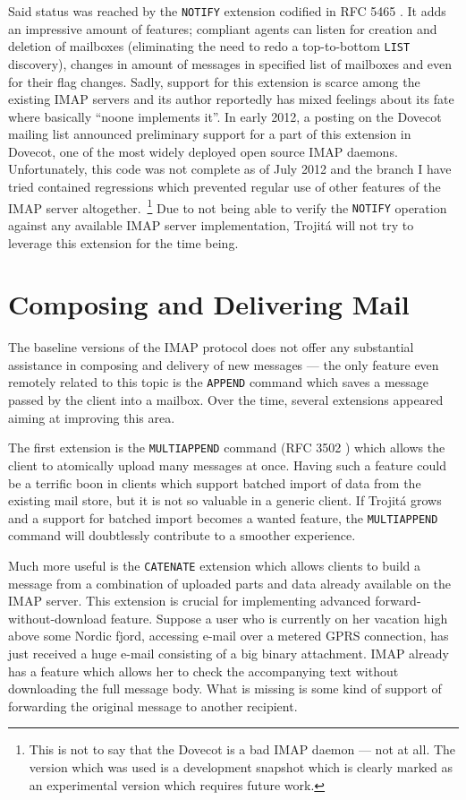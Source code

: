 \documentclass[trojita]{subfiles}
\begin{document}
Said status was reached by the {\tt NOTIFY} extension codified in RFC 5465 \cite{rfc5465}.  It adds an impressive amount
of features; compliant agents can listen for creation and deletion of mailboxes (eliminating the need to redo a
top-to-bottom {\tt LIST} discovery), changes in amount of messages in specified list of mailboxes and even for their
flag changes.  Sadly, support for this extension is scarce among the existing IMAP servers and its author reportedly has
mixed feelings \cite{arnt-good-bad-rfc} about its fate where basically ``noone implements it''.  In early 2012, a
posting on the Dovecot mailing list announced \cite{dovecot-imap-notify} preliminary support for a part of this
extension in Dovecot, one of the most widely deployed open source IMAP daemons.  Unfortunately, this code was not
complete as of July 2012 \cite{dovecot-hg-notify} and the branch I have tried contained regressions which prevented
regular use of other features of the IMAP server altogether.~\footnote{This is not to say that the Dovecot is a bad IMAP
daemon --- not at all.  The version which was used is a development snapshot which is clearly marked as an experimental
version which requires future work.}  Due to not being able to verify the {\tt NOTIFY} operation against any available
IMAP server implementation, Trojitá will not try to leverage this extension for the time being.

\section{Composing and Delivering Mail}

The baseline versions of the IMAP protocol does not offer any substantial assistance in composing and delivery of new
messages --- the only feature even remotely related to this topic is the {\tt APPEND} command which saves a message
passed by the client into a mailbox.  Over the time, several extensions appeared aiming at improving this area.

The first extension is the {\tt MULTIAPPEND} command (RFC 3502 \cite{rfc3502}) which allows the client to atomically
upload many messages at once.  Having such a feature could be a terrific boon in clients which support batched import of
data from the existing mail store, but it is not so valuable in a generic client.  If Trojitá grows and a support for
batched import becomes a wanted feature, the {\tt MULTIAPPEND} command will doubtlessly contribute to a smoother
experience.

Much more useful is the {\tt CATENATE} extension \cite{rfc4469} which allows clients to build a message from a
combination of uploaded parts and data already available on the IMAP server.  This extension is crucial for implementing
advanced forward-without-download feature.  Suppose a user who is currently on her vacation high above some Nordic
fjord, accessing e-mail over a metered GPRS connection, has just received a huge e-mail consisting of a big binary
attachment.  IMAP already has a feature which allows her to check the accompanying text without downloading the full
message body.  What is missing is some kind of support of forwarding the original message to another recipient.
\end{document}
